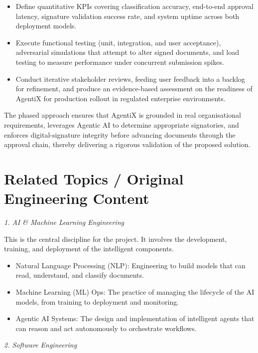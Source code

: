 \documentclass[12pt,oneside,openright,a4paper]{cpe-english-project}
\begin{document}
\begin{itemize}
\item Define quantitative KPIs covering classification accuracy,
end-to-end approval latency, signature validation success rate, and
system uptime across both deployment models.
\item Execute functional testing (unit, integration, and user
acceptance), adversarial simulations that attempt to alter signed
documents, and load testing to measure performance under concurrent
submission spikes.
\item Conduct iterative stakeholder reviews, feeding user feedback into
a backlog for refinement, and produce an evidence-based assessment on
the readiness of AgentiX for production rollout in regulated enterprise
environments.
\end{itemize}

The phased approach ensures that AgentiX is grounded in real
organisational requirements, leverages Agentic AI to determine
appropriate signatories, and enforces digital-signature integrity before
advancing documents through the approval chain, thereby delivering a
rigorous validation of the proposed solution.

\vspace{1em}

\section{Related Topics / Original Engineering Content}

\emph{1. AI \& Machine Learning Engineering}

This is the central discipline for the project. It involves the
development, training, and deployment of the intelligent components.

\begin{itemize}
\item
  Natural Language Processing (NLP): Engineering to build models that
  can read, understand, and classify documents.
\item
  Machine Learning (ML) Ops: The practice of managing the lifecycle of
  the AI models, from training to deployment and monitoring.
\item
  Agentic AI Systems: The design and implementation of intelligent
  agents that can reason and act autonomously to orchestrate workflows.
\end{itemize}

\emph{2. Software Engineering}
\end{document}
